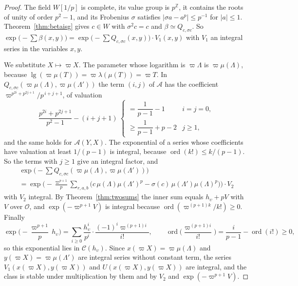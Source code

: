 \begin{proof}
The field $W[1/p]$ is complete, its value group is $p^{\mathbb Z}$, it contains the roots of unity of order $p^2-1$, and its Frobenius $\sigma$ satisfies $\lvert\sigma a-a^p\rvert\le p^{-1}$ for $\lvert a\rvert\le1$. Theorem~\ref{thm:betaisg} gives $c\in W$ with $\sigma^2c=c$ and $\beta\simeq Q_{c,\sigma c}$. So $\exp\big(-\sum\beta(x,y)\big)=\exp\big(-\sum Q_{c,\sigma c}(x,y)\big)\cdot V_1(x,y)$ with $V_1$ an integral series in the variables $x,y$.

We substitute $X\mapsto\varpi X$. The parameter whose logarithm is $\varpi\Lambda$ is $\varpi\mu(\Lambda)$, because $\operatorname{lg}(\varpi\mu(T))=\varpi\lambda(\mu(T))=\varpi T$. In $Q_{c,\sigma c}(\varpi\mu(\Lambda),\varpi\mu(\Lambda'))$ the term $(i,j)$ of $\mathcal A$ has the coefficient $\varpi^{p^{2i}+p^{2j+1}}/p^{\,i+j+1}$, of valuation
\[
\frac{p^{2i}+p^{2j+1}}{p^2-1}-(i+j+1)\ \begin{cases}=\dfrac1{p-1}-1&i=j=0,\\[1.5ex]\ge\dfrac1{p-1}+p-2&j\ge1,\end{cases}
\]
and the same holds for $\mathcal A(Y,X)$. The exponential of a series whose coefficients have valuation at least $1/(p-1)$ is integral, because $\operatorname{ord}(k!)\le k/(p-1)$. So the terms with $j\ge1$ give an integral factor, and
\begin{multline*}
\exp\Big(-\sum Q_{c,\sigma c}(\varpi\mu(\Lambda),\varpi\mu(\Lambda'))\Big)\\
=\exp\Big(-\frac{\varpi^{p+1}}p\sum_{r,a,b}\big(c\,\mu(\Lambda)\mu(\Lambda')^p-\sigma(c)\,\mu(\Lambda')\mu(\Lambda)^p\big)\Big)\cdot V_2
\end{multline*}
with $V_2$ integral. By Theorem~\ref{thm:twosums} the inner sum equals $h_\upsilon+pV$ with $V$ over $\mathcal O$, and $\exp(-\varpi^{p+1}V)$ is integral because $\operatorname{ord}(\varpi^{(p+1)k}/k!)\ge0$. Finally
\[
\exp\Big(-\frac{\varpi^{p+1}}p\,h_\upsilon\Big)=\sum_{i\ge0}\frac{h_\upsilon^i}{p^i}\cdot\frac{(-1)^i\varpi^{(p+1)i}}{i!},\qquad\operatorname{ord}\Big(\frac{\varpi^{(p+1)i}}{i!}\Big)=\frac i{p-1}-\operatorname{ord}(i!)\ge0,
\]
so this exponential lies in $\mathcal C(h_\upsilon)$. Since $x(\varpi X)=\varpi\mu(\Lambda)$ and $y(\varpi X)=\varpi\mu(\Lambda')$ are integral series without constant term, the series $V_1(x(\varpi X),y(\varpi X))$ and $U(x(\varpi X),y(\varpi X))$ are integral, and the class is stable under multiplication by them and by $V_2$ and $\exp(-\varpi^{p+1}V)$.
\end{proof}

